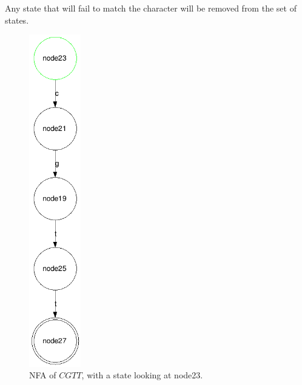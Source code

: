 Any state that will fail to match the character will be removed from the set of states.
\begin{figure}[h!]
\begin{minipage}[b]{0.40\linewidth}
  \centering
      \includegraphics[width=0.2\textwidth]{lib/cgtt1.png}
    \caption{NFA of $CGTT$, with a state looking at node23.\\}
    \label{fig:CGTT_1}
  \end{minipage}
\begin{minipage}[b]{0.40\linewidth}
\centering

\end{minipage}
\end{figure}
